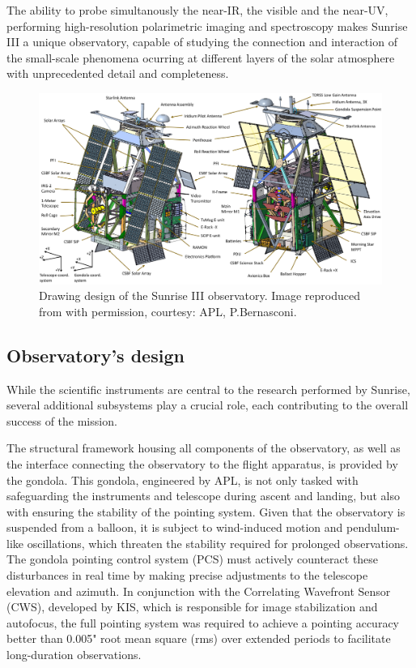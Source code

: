 The ability to probe simultanously the near-IR, the visible and the near-UV, performing high-resolution polarimetric imaging and spectroscopy makes Sunrise III a unique observatory, capable of studying the connection  and interaction of the small-scale phenomena ocurring at different layers of the solar atmosphere with unprecedented detail and completeness. 

\begin{figure}[t]
    \includegraphics[width=\textwidth]{figures/TuMag/Sunrise_schematic.png}
    \caption[Sunrise III observatory design.]{
      Drawing design of the Sunrise III observatory. Image reproduced from \citep{SunriseIII} with permission, courtesy: APL, P.Bernasconi.}
      \label{fig: SunriseIII}
\end{figure}

\subsection{Observatory's design}

While the scientific instruments are central to the research performed by Sunrise, several additional subsystems play a crucial role, each contributing to the overall success of the mission.

The structural framework housing all components of the observatory, as well as the interface connecting the observatory to the flight apparatus, is provided by the gondola. This gondola, engineered by APL, is not only tasked with safeguarding the instruments and telescope during ascent and landing, but also with ensuring the stability of the pointing system. Given that the observatory is suspended from a balloon, it is subject to wind-induced motion and pendulum-like oscillations, which threaten the stability required for prolonged observations. The gondola pointing control system (PCS) must actively counteract these disturbances in real time by making precise adjustments to the telescope elevation and azimuth. In conjunction with the Correlating Wavefront Sensor (CWS), developed by KIS, which is responsible for image stabilization and autofocus, the full pointing system was required to achieve a pointing accuracy better than 0.005" root mean square (rms) over extended periods to facilitate long-duration observations.

